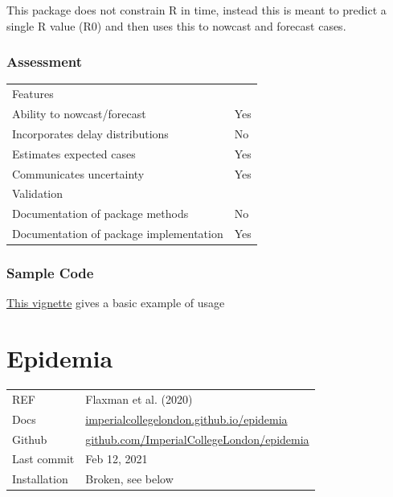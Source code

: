 \documentclass[
  letterpaper,
  DIV=11,
  numbers=noendperiod]{scrreprt}
\begin{document}
This package does not constrain R in time, instead this is meant to
predict a single R value (R0) and then uses this to nowcast and forecast
cases.

\subsection*{Assessment}\label{assessment-1}

\begin{longtable}[]{@{}
  >{\raggedright\arraybackslash}p{}
  >{\raggedright\arraybackslash}p{}@{}}
\toprule\noalign{}
\endhead
\bottomrule\noalign{}
\endlastfoot
Features & \\
Ability to nowcast/forecast & Yes \\
Incorporates delay distributions & No \\
Estimates expected cases & Yes \\
Communicates uncertainty & Yes \\
Validation & \\
Documentation of package methods & No \\
Documentation of package implementation & Yes \\
\end{longtable}

\subsection*{Sample Code}\label{sample-code-1}

\href{https://cran.r-project.org/web/packages/earlyR/vignettes/earlyR.html}{This
vignette} gives a basic example of usage

\chapter*{Epidemia}\label{epidemia}


\begin{longtable}[]{@{}
  >{\raggedright\arraybackslash}p{}
  >{\raggedright\arraybackslash}p{}@{}}
\toprule\noalign{}
\endhead
\bottomrule\noalign{}
\endlastfoot
REF & Flaxman et al. (2020) \\
Docs &
\href{https://imperialcollegelondon.github.io/epidemia/index.html}{imperialcollegelondon.github.io/epidemia} \\
Github &
\href{https://github.com/ImperialCollegeLondon/epidemia}{github.com/ImperialCollegeLondon/epidemia} \\
Last commit & Feb 12, 2021 \\
Installation & Broken, see below \\
\end{longtable}
\end{document}
